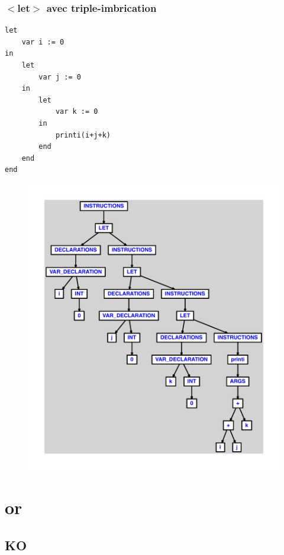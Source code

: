 \documentclass{article}
\begin{document}
\subsubsection{$ < $let$ > $ avec triple-imbrication}
\begin{lstlisting}
let
	var i := 0
in
	let
		var j := 0
	in
		let
			var k := 0
		in
			printi(i+j+k)
		end
	end
end
\end{lstlisting}
\newpage
\begin{figure}[H]
\centering
\includegraphics[max width=\textwidth]{ast/ast_280.pdf}
\end{figure}
\newpage
\section{or}
\subsection{KO}
\end{document}
